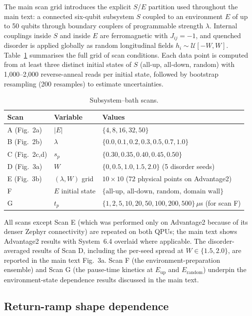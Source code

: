 \documentclass[aps,prapplied,reprint,superscriptaddress,floatfix,nofootinbib]{revtex4-2}
\begin{document}
The main scan grid introduces the explicit $S$/$E$ partition used throughout the main text: a connected six-qubit subsystem $S$ coupled to an environment $E$ of up to 50 qubits through boundary couplers of programmable strength $\lambda$.
Internal couplings inside $S$ and inside $E$ are ferromagnetic with $J_{ij}=-1$, and quenched disorder is applied globally as random longitudinal fields $h_i \sim \mathcal{U}[-W, W]$.
Table~\ref{tab:phase4} summarises the full grid of scan conditions.
Each data point is computed from at least three distinct initial states of $S$ (all-up, all-down, random) with 1{,}000--2{,}000 reverse-anneal reads per initial state, followed by bootstrap resampling (200 resamples) to estimate uncertainties.

\begin{table}[!htbp]
\centering
\caption{Subsystem--bath scans.}
\label{tab:phase4}
\small
\begin{tabular}{lll}
\toprule
Scan & Variable & Values \\
\midrule
A (Fig.~2a) & $|E|$ & $\{4, 8, 16, 32, 50\}$ \\
B (Fig.~2b) & $\lambda$ & $\{0.0, 0.1, 0.2, 0.3, 0.5, 0.7, 1.0\}$ \\
C (Fig.~2c,d) & $s_p$ & $\{0.30, 0.35, 0.40, 0.45, 0.50\}$ \\
D (Fig.~3a) & $W$ & $\{0, 0.5, 1.0, 1.5, 2.0\}$ (5 disorder seeds) \\
E (Fig.~3b) & $(\lambda, W)$ grid & $10 \times 10$ ($72$ physical points on Advantage2) \\
F & $E$ initial state & $\{\text{all-up, all-down, random, domain wall}\}$ \\
G & $t_p$ & $\{1, 2, 5, 10, 20, 50, 100, 200, 500\}\,\mu$s (for scan F) \\
\bottomrule
\end{tabular}
\end{table}

All scans except Scan E (which was performed only on Advantage2 because of its denser Zephyr connectivity) are repeated on both QPUs; the main text shows Advantage2 results with System~6.4 overlaid where applicable.
The disorder-averaged results of Scan D, including the per-seed spread at $W \in \{1.5, 2.0\}$, are reported in the main text Fig.~3a.
Scan F (the environment-preparation ensemble) and Scan G (the pause-time kinetics at $E_{\text{up}}$ and $E_{\text{random}}$) underpin the environment-state dependence results discussed in the main text.

\subsection{Return-ramp shape dependence}
\label{sec:ramp}
\end{document}
